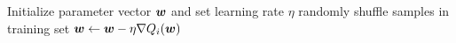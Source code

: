 \begin{algorithmic}
    \State Initialize parameter vector $\bm{w}$ and set learning rate $\eta$
        \State randomly shuffle samples in training set
            \State $\bm{w} \gets \bm{w} - \eta \nabla Q_i(\bm{w})$
        \EndFor
    \EndWhile
\end{algorithmic}

